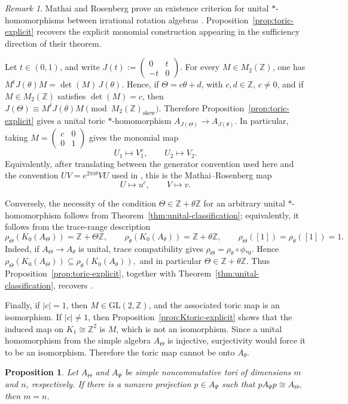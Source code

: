 \documentclass[11pt]{amsart}
\newtheorem{proposition}[theorem]{Proposition}
\theoremstyle{definition}
\theoremstyle{remark}
\newtheorem{remark}[theorem]{Remark}
\newcommand{\Z}{\mathbb{Z}}
\newcommand{\GL}{\mathrm{GL}}
\begin{document}
\begin{remark}
\label{rem:MR21-prop37}
Mathai and Rosenberg prove an existence criterion for unital
$*$-homomorphisms between irrational rotation algebras
\cite[Theorem~2.1]{MathaiRosenberg}. Proposition~\ref{prop:toric-explicit}
recovers the explicit monomial construction appearing in the sufficiency
direction of their theorem.

Let $t\in(0,1)$, and write $J(t):=
\begin{pmatrix}
0&t\\
-t&0
\end{pmatrix}.$
For every $M\in M_2(\Z)$, one has $M^tJ(\theta)M=\det(M)\,J(\theta).$
Hence, if $\Theta=c\theta+d$, with
$c,d\in\Z$, $c\neq0$,
and if $M\in M_2(\Z)$ satisfies $\det(M)=c$, then $J(\Theta)\equiv M^tJ(\theta)M
\pmod{M_2(\Z)_{\mathrm{skew}}}.$
Therefore Proposition~\ref{prop:toric-explicit} gives a unital toric
$*$-homomorphism $A_{J(\Theta)}\longrightarrow A_{J(\theta)}.$
In particular, taking $M=
\begin{pmatrix}
c&0\\
0&1
\end{pmatrix}$
gives the monomial map
\[
U_1\longmapsto V_1^c,
\qquad
U_2\longmapsto V_2.
\]
Equivalently, after translating between the generator convention used here and
the convention $UV=e^{2\pi i\theta}VU$ used in
\cite{MathaiRosenberg}, this is the Mathai--Rosenberg map
\[
U\longmapsto u^c,
\qquad
V\longmapsto v.
\]

Conversely, the necessity of the condition $\Theta\in \Z+\theta\Z$ for an
arbitrary unital $* $-homomorphism follows from
Theorem~\ref{thm:unital-classification}; equivalently, it follows from the
trace-range description
\[
\rho_\Theta(K_0(A_\Theta))=\Z+\Theta\Z,
\qquad
\rho_\theta(K_0(A_\theta))=\Z+\theta\Z,
\qquad
\rho_\Theta([1])=\rho_\theta([1])=1.
\]
Indeed, if $A_\Theta\to A_\theta$ is unital, trace compatibility gives $\rho_\Theta=\rho_\theta\circ\phi_{*0}.$
Hence $\rho_\Theta(K_0(A_\Theta))
\subseteq
\rho_\theta(K_0(A_\theta)),$
and in particular $\Theta\in \Z+\theta\Z$. Thus
Proposition~\ref{prop:toric-explicit}, together with
Theorem~\ref{thm:unital-classification}, recovers
\cite[Theorem~2.1]{MathaiRosenberg}.

Finally, if $|c|=1$, then $M\in \GL(2,\Z)$, and the associated toric map is
an isomorphism. If $|c|\neq1$, then Proposition~\ref{prop:Ktoric-explicit}
shows that the induced map on $K_1\cong\Z^2$
is $M$, which is not an isomorphism. Since a unital homomorphism from the
simple algebra $A_\Theta$ is injective, surjectivity would force it to be an
isomorphism. Therefore the toric map cannot be onto $A_\theta$.
\end{remark}
\begin{proposition}
\label{prop:dimension-rigidity-explicit}
Let $A_\Theta$ and $A_\Psi$ be simple noncommutative tori of dimensions
$m$ and $n$, respectively. If there is a nonzero projection
$p\in A_\Psi$ such that $pA_\Psi p\cong A_\Theta,$
then $m=n$.
\end{proposition}
\end{document}
